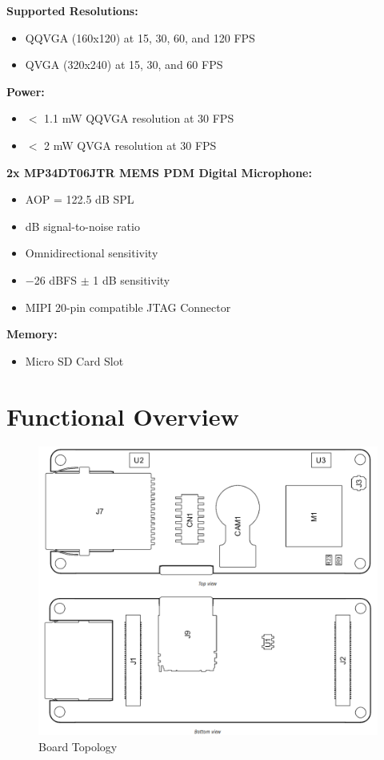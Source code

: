	\textbf{Supported Resolutions:}
	\begin{itemize}
		\item QQVGA (160x120) at 15, 30, 60, and 120 FPS 
		\item QVGA (320x240) at 15, 30, and 60 FPS
	\end{itemize}
	
	\textbf{Power:}
	\begin{itemize}
		\item $<$ 1.1 mW QQVGA resolution at 30 FPS
		\item $<$ 2 mW QVGA resolution at 30 FPS 
	\end{itemize}
	
	\textbf{2x MP34DT06JTR MEMS PDM Digital Microphone:}
	\begin{itemize}
		\item AOP = 122.5 dB SPL 
		\item dB signal-to-noise ratio 
		\item Omnidirectional sensitivity 
		\item $-$26 dBFS $\pm$ 1 dB sensitivity 
		\item MIPI 20-pin compatible JTAG Connector 
	\end{itemize}
	
	\textbf{Memory:}
	\begin{itemize}
		\item Micro SD Card Slot
	\end{itemize}

\section{Functional Overview}



\begin{figure}
	\begin{center}
		\includegraphics[width=0.7\linewidth]{Images/VisionShield/BoardTopology.png}
		\caption{Board Topology}
		\label{BoardTopology}
	\end{center}
\end{figure}


